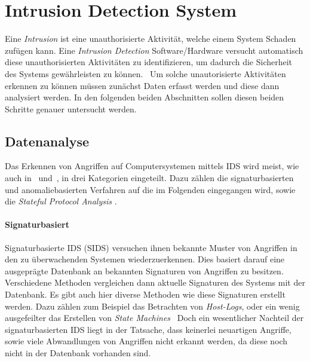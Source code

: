 

    \section{Intrusion Detection System}
    \label{sec:IDS}
        Eine \textit{Intrusion}  ist eine unauthorisierte Aktivität, welche einem System Schaden zufügen kann.
        Eine \textit{Intrusion Detection} Software/Hardware versucht automatisch diese 
        unauthorisierten Aktivitäten zu identifizieren, um dadurch die Sicherheit des Systems gewährleisten zu können.~\cite{IDSreview}
        Um solche unautorisierte Aktivitäten erkennen zu können müssen zunächst Daten erfasst werden und diese dann analysiert werden.
        In den folgenden beiden Abschnitten sollen diesen beiden Schritte genauer untersucht werden.

        \subsection{Datenanalyse}
        \label{sec:Datenanalyse}
            Das Erkennen von Angriffen auf Computersystemen mittels IDS wird meist, wie auch in~\cite{IDSreview} und~\cite{IDSsurvey}, in drei Kategorien eingeteilt.
            Dazu zählen die signaturbasierten und anomaliebasierten Verfahren auf die im Folgenden eingegangen wird,
            sowie die \textit{Stateful Protocol Analysis} .
            \paragraph{Signaturbasiert} 
            Signaturbasierte IDS (SIDS) versuchen ihnen bekannte Muster von Angriffen in den zu überwachenden Systemen wiederzuerkennen.
                Dies basiert darauf eine ausgeprägte Datenbank an bekannten Signaturen von Angriffen zu besitzen.
                Verschiedene Methoden vergleichen dann aktuelle Signaturen des Systems mit der Datenbank.
                Es gibt auch hier diverse Methoden wie diese Signaturen erstellt werden. 
                Dazu zählen zum Beispiel das Betrachten von \textit{Host-Logs}, oder ein wenig ausgefeilter das Erstellen von \textit{State Machines}~\cite{SIDSstate}
                Doch ein wesentlicher Nachteil der signaturbasierten IDS liegt in der Tatsache, dass keinerlei neuartigen Angriffe, sowie viele Abwandlungen von Angriffen nicht erkannt werden,
                da diese noch nicht in der Datenbank vorhanden sind.~\cite{IDSsurvey}
